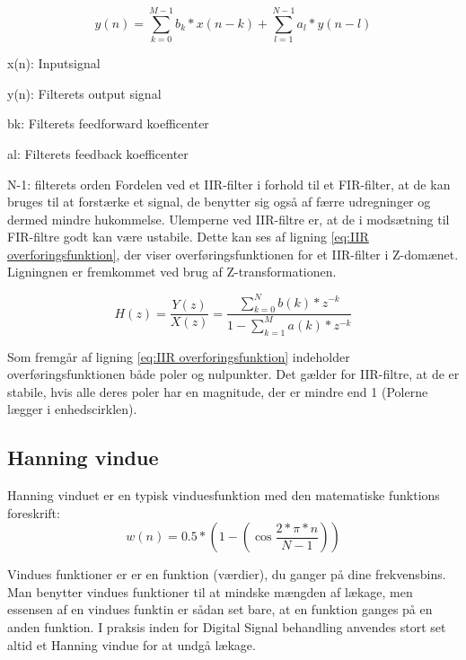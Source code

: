 \begin{equation}\label{eq:IIR}
{y(n)} = \displaystyle\sum_{k=0}^{M-1} {b_{k}*x(n-k)}+\displaystyle\sum_{l=1}^{N-1} {a_{l}*y(n-l)}
\end{equation}

x(n): Inputsignal

y(n): Filterets output signal

b{k}: Filterets feedforward koefficenter

a{l}: Filterets feedback koefficenter

N-1: filterets orden
\newline
\newline
Fordelen ved et IIR-filter i forhold til et FIR-filter, at de kan bruges til at forstærke et signal, de benytter sig også af færre udregninger og dermed mindre hukommelse. 
Ulemperne ved IIR-filtre er, at de i modsætning til FIR-filtre godt kan være ustabile. 
Dette kan ses af ligning \eqref{eq:IIR overforingsfunktion}, der viser overføringsfunktionen for et IIR-filter i Z-domænet. Ligningnen er fremkommet ved brug af Z-transformationen.

\begin{equation}\label{eq:IIR overforingsfunktion}
{H(z)} =\frac{Y(z)}{X(z)} =\frac{\displaystyle\sum_{k=0}^{N} {b(k)*z^{-k}}}{1-\displaystyle\sum_{k=1}^{M} {a(k)*z^{-k}}}
\end{equation}

Som fremgår af ligning \eqref{eq:IIR overforingsfunktion} indeholder overføringsfunktionen både poler og nulpunkter. Det gælder for IIR-filtre, at de er stabile, hvis alle deres poler har en magnitude, der er mindre end 1 (Polerne lægger i enhedscirklen).

\subsection{Hanning vindue}
Hanning vinduet er en typisk vinduesfunktion med den matematiske funktions foreskrift:
\begin{equation}\label{eq:Hanning}
{w(n)} ={0.5*(1-(\cos \frac{2*\pi*n}{N-1}))}
\end{equation}


Vindues funktioner er er en funktion (værdier), du ganger på dine frekvensbins. Man benytter vindues funktioner til at mindske mængden af lækage, men essensen af en vindues funktin er sådan set bare, at en funktion ganges på en anden funktion. I praksis inden for Digital Signal behandling anvendes stort set altid et Hanning vindue for at undgå lækage.
